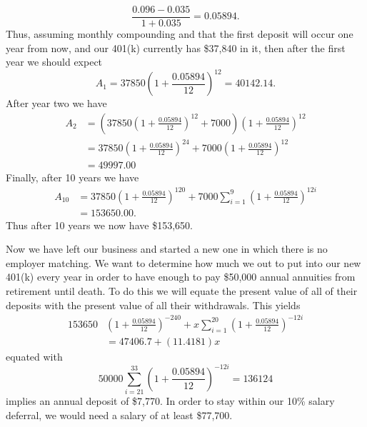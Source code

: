 \documentclass[leqno]{article}
\theoremstyle{definition}
\theoremstyle{remark}
\begin{document}
\begin{itemize}
            \begin{equation*}
                \frac{0.096-0.035}{1+0.035}=0.05894.
            \end{equation*}
        Thus, assuming monthly compounding and that the first deposit will occur one year from now, and our 401(k) currently has \$37,840 in it, then after the first year we should expect
            \begin{equation*}
                A_1=37850\left(1+\frac{0.05894}{12}\right)^{12}=40142.14.
            \end{equation*}
        After year two we have
            \begin{equation*}
                \begin{split}
                    A_2&=\left(37850\left(1+\frac{0.05894}{12}\right)^{12}+7000\right)\left(1+\frac{0.05894}{12}\right)^{12} \\
                    &=37850\left(1+\frac{0.05894}{12}\right)^{24}+7000\left(1+\frac{0.05894}{12}\right)^{12} \\
                    &= 49997.00
                \end{split}
            \end{equation*}
        Finally, after 10 years we have 
            \begin{equation*}
                \begin{split}
                    A_{10}&=37850\left(1+\frac{0.05894}{12}\right)^{120}+7000\sum_{i=1}^{9}\left(1+\frac{0.05894}{12}\right)^{12i}\\
                    &=153650.00.
                \end{split}
            \end{equation*}
        Thus after 10 years we now have \$153,650.\par\hspace{4mm} Now we have left our business and started a new one in which there is no employer matching. We want to determine how much we out to put into our new 401(k) every year in order to have enough to pay \$50,000 annual annuities from retirement until death. To do this we will equate the present value of all of their deposits with the present value of all their withdrawals. This yields 
            \begin{equation*}
                \begin{split}
                153650&\left(1+\frac{0.05894}{12}\right)^{-240}+x\sum_{i=1}^{20}\left(1+\frac{0.05894}{12}\right)^{-12i} \\
                &=47406.7+(11.4181)x
                \end{split}
            \end{equation*}
        equated with
            \begin{equation*}
                50000\sum_{i=21}^{33}\left(1+\frac{0.05894}{12}\right)^{-12i}=136124
            \end{equation*}
        implies an annual deposit of \$7,770. In order to stay within our 10\% salary deferral, we would need a salary of at least \$77,700.
    \end{itemize}
    \newpage 
\end{document}

